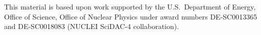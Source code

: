 \documentclass[aps,prc,twocolumn,floatfix,nofootinbib,preprintnumbers,superscriptaddress,longbibliography]{revtex4-1}
\begin{document}
\begin{acknowledgements}
This material is based upon work supported by the U.S.\ Department of Energy, Office of Science, Office of Nuclear Physics under award numbers DE-SC0013365 and DE-SC0018083 (NUCLEI SciDAC-4 collaboration).
\end{acknowledgements}



\end{document}
